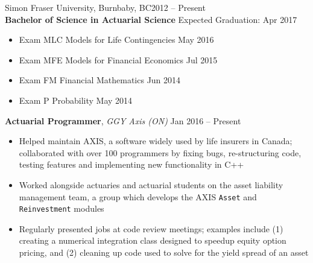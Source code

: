 \documentclass[11pt]{article}
\def\university{Simon Fraser University}
\def\universitycity{Burnbaby, BC}
\def\universitydate{2012 -- Present}
\def\degree{Bachelor of Science in Actuarial Science}
\begin{document}
    \afterpage{\cfoot{\thepage}}

\large
{}

\vspace{1mm}
\begin{addmargin}[3em]{0em}
\university, \universitycity \hfill \universitydate \\
\textbf{\degree} \hfill Expected Graduation: Apr 2017
\end{addmargin}

\medskip
{}

\vspace{1mm}

\begin{addmargin}[0.9em]{0em}
\begin{itemize}
\setlength\itemsep{-0.4em}
\item[] Exam MLC \hspace{7.4mm} Models for Life Contingencies \hfill May 2016
\item[] Exam MFE \hspace{7.8mm} Models for Financial Economics \hfill Jul 2015
\item[] Exam FM \hspace{10.25mm} Financial Mathematics \hfill Jun 2014
\item[] Exam P \hspace{14mm} Probability \hfill May 2014
\end{itemize}
\end{addmargin}

\medskip
{}
%
\vspace{1mm}
\begin{addmargin}[2.75em]{0em}
\textbf{Actuarial Programmer}, \textit{GGY Axis (ON)}
\hfill Jan 2016 -- Present
\end{addmargin}
%
\vspace{1mm}
\begin{addmargin}[1.75em]{0em}
\begin{itemize}
\setlength\itemsep{-0.4em}
\item Helped maintain AXIS, a software widely used by life insurers in Canada; collaborated with over 100 programmers by fixing bugs, re-structuring code, testing features and implementing new functionality in C++
\item Worked alongside actuaries and actuarial students on the asset liability management team, a group which develops the AXIS \texttt{Asset} and \texttt{Reinvestment} modules
\item Regularly presented jobs at code review meetings; examples include (1) creating a numerical integration class designed to speedup equity option pricing, and (2) cleaning up code used to solve for the yield spread of an asset
\end{itemize}
\end{addmargin}
\end{document}
